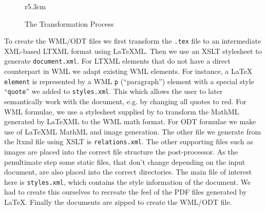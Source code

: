 \documentclass{llncs}
\def\latexml{{\LaTeX}ML\xspace}
\begin{document}
\begin{figure}r{5.3cm}\scriptsize\vspace*{-2em}
\caption{The Transformation Process}\label{fig:arch}\vspace*{-1em}
\end{figure}
To create the WML/ODT files we first transform the \texttt{.tex} file to an intermediate
XML-based \textsf{LTXML} format using \latexml. Then we use an XSLT stylesheet to generate
\texttt{document.xml}. For \textsf{LTXML} elements that do not have a direct counterpart
in WML we adapt existing WML elements. For instance, a {\LaTeX} \texttt{element} is
represented by a WML \texttt{p} (``paragraph'') element with a special style
``\texttt{quote}'' we added to \texttt{styles.xml}. This which allows the user to later
semantically work with the document, e.g. by changing all quotes to red.  For WML
formulae, we use a stylesheet supplied by to transform the MathML generated by \latexml to
the WML math format. For ODT formulae we make use of \latexml MathML and image generation.
The other file we generate from the ltxml file using XSLT is \texttt{relations.xml}. The
other supporting files such as images are placed into the correct file structure the
post-processor. As the penultimate step some static files, that don't change depending on
the input document, are also placed into the correct directories. The main file of
interest here is \texttt{styles.xml}, which contains the style information of the
document. We had to create this ourselves to recreate the feel of the PDF files generated
by {\LaTeX}. Finally the documents are zipped to create the WML/ODT file.
\end{document}

